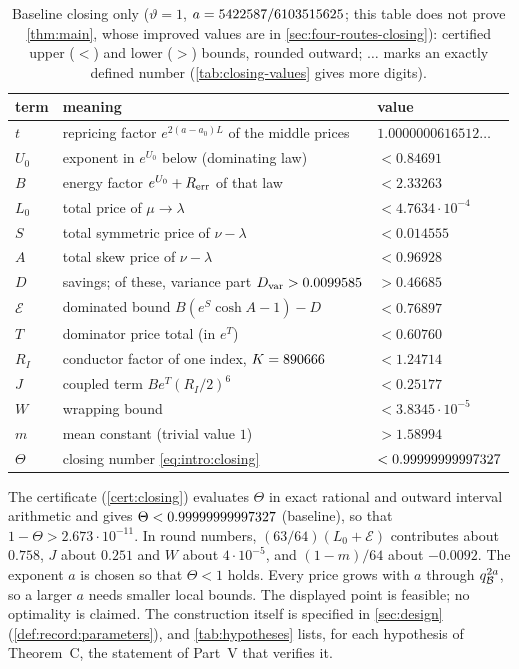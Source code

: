 \begin{table}[ht]
\centering
\caption{Baseline closing only ($\vartheta=1$, $a=5422587/6103515625$; this table
does not prove \cref{thm:main}, whose improved values are in
\cref{sec:four-routes-closing}): certified upper ($<$) and lower
($>$) bounds, rounded outward; $\ldots$ marks an exactly defined
number (\cref{tab:closing-values} gives more digits).}
\label{tab:intro:values}
\small
\begin{tabular}{@{}lll@{}}
\toprule
term & meaning & value\\
\midrule
$t$ & repricing factor $e^{2(a-a_0)L}$ of the middle prices & $1.0000000616512\ldots$\\
$U_0$ & exponent in $e^{U_0}$ below (dominating law) & $<0.84691$\\
$B$ & energy factor $e^{U_0}+R_{\rm err}$ of that law & $<2.33263$\\
$L_0$ & total price of $\mu\to\lambda$ & $<4.7634\cdot10^{-4}$\\
$S$ & total symmetric price of $\nu-\lambda$ & $<0.014555$\\
$A$ & total skew price of $\nu-\lambda$ & $<0.96928$\\
$D$ & savings; of these, variance part $D_{\rm var}>0.0099585$ & $>0.46685$\\
$\mathcal E$ & dominated bound $B(e^S\cosh A-1)-D$ & $<0.76897$\\
$T$ & dominator price total (in $e^T$) & $<0.60760$\\
$R_I$ & conductor factor of one index, $K=890666$ & $<1.24714$\\
$J$ & coupled term $Be^T(R_I/2)^6$ & $<0.25177$\\
$W$ & wrapping bound & $<3.8345\cdot10^{-5}$\\
$m$ & mean constant (trivial value $1$) & $>1.58994$\\
$\Theta$ & closing number \eqref{eq:intro:closing} & $<0.99999999997327$\\
\bottomrule
\end{tabular}
\end{table}

The certificate (\cref{cert:closing}) evaluates $\Theta$ in exact
rational and outward interval arithmetic and gives
$\Theta<0.99999999997327$ (baseline), so that
$1-\Theta>2.673\cdot10^{-11}$. In round numbers,
$(63/64)(L_0+\mathcal E)$ contributes about $0.758$, $J$ about $0.251$
and $W$ about $4\cdot10^{-5}$, and $(1-m)/64$ about $-0.0092$. The
exponent $a$ is chosen so that $\Theta<1$ holds. Every price grows
with $a$ through $q_{\mathcal B}^{2a}$, so a larger $a$ needs smaller local
bounds. The displayed point is feasible; no optimality is claimed. The construction
itself is specified in \cref{sec:design} (\cref{def:record:parameters}), and
\cref{tab:hypotheses} lists, for each hypothesis of Theorem~C, the
statement of Part~V that verifies it.

